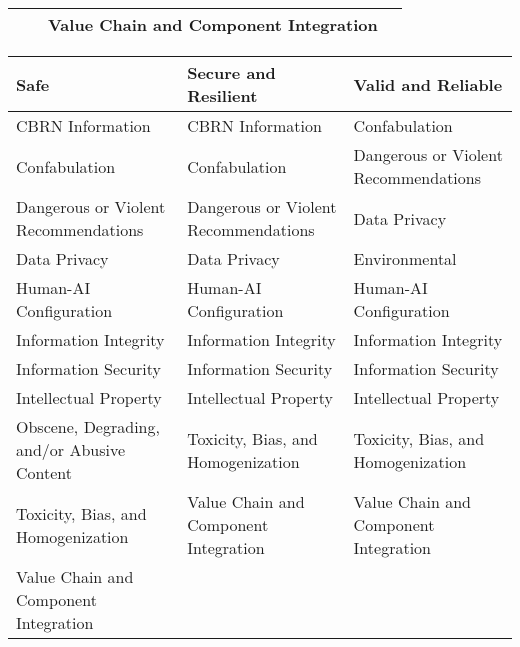 \documentclass[fleqn]{article}
\begin{document}
\begin{landscape}
\begin{table}[H]
\begin{tabular}{llll}
		&  & Value Chain and Component Integration &  \\
		\bottomrule
	\end{tabular}
	\newline
	\vspace{10pt}
	\newline
	\begin{tabular}{lll}
		\toprule
		Safe & Secure and Resilient & Valid and Reliable \\
		\midrule
		CBRN Information & CBRN Information & Confabulation \\
		Confabulation & Confabulation & Dangerous or Violent Recommendations \\
		Dangerous or Violent Recommendations & Dangerous or Violent Recommendations & Data Privacy \\
		Data Privacy & Data Privacy & Environmental \\
		Human-AI Configuration & Human-AI Configuration & Human-AI Configuration \\
		Information Integrity & Information Integrity & Information Integrity \\
		Information Security & Information Security & Information Security \\
		Intellectual Property & Intellectual Property & Intellectual Property \\
		Obscene, Degrading, and/or Abusive Content & Toxicity, Bias, and Homogenization & Toxicity, Bias, and Homogenization \\
		Toxicity, Bias, and Homogenization & Value Chain and Component Integration & Value Chain and Component Integration \\
		Value Chain and Component Integration &  &  \\
		\bottomrule
	\end{tabular}
\end{table}
\vfill
\raisebox{-10pt}{\makebox[\linewidth]{\thepage}}
\end{landscape}
\end{document}
